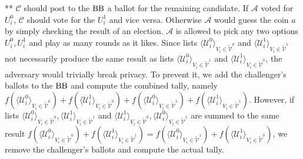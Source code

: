 ** $\mathcal{C}$ should post to the $\operatorname{BB}$ a ballot for the remaining candidate. If  $\mathcal{A}$  voted for $U_i^0$, $\mathcal{C}$ should vote for the $U_i^1$ and vice versa. Otherwise  $\mathcal{A}$  would guess the coin $a$ by simply checking the result of an election.  $\mathcal{A}$ is allowed to pick any two options $U_i^0,U_i^1$  and play as many rounds as it likes. Since lists $\langle \mathcal{U}^0_i \rangle _{V_i \in \tilde{\mathcal{V}}^0} $ and  $\langle \mathcal{U}^1_i \rangle _{V_i \in \tilde{\mathcal{V}}^1} $  not necessarily produce the same result as lists  $\langle \mathcal{U}^0_i \rangle _{V_i \in \tilde{\mathcal{V}}^1} $ and  $\langle \mathcal{U}^1_i \rangle _{V_i \in \tilde{\mathcal{V}}^0} $, the adversary would trivially break privacy. To prevent it, we add the challenger's ballots to the $\operatorname{BB}$ and compute the combined tally, namely $f(\langle \mathcal{U}^0_i \rangle _{V_i \in \tilde{\mathcal{V}}^0} ) + f(\langle \mathcal{U}^1_i \rangle _{V_i \in \tilde{\mathcal{V}}^0} )+ f(\langle \mathcal{U}^0_i \rangle _{V_i \in \tilde{\mathcal{V}}^1} ) +  f(\langle \mathcal{U}^1_i \rangle _{V_i \in \tilde{\mathcal{V}}^1} )$. However, if lists $\langle \mathcal{U}^0_i \rangle _{V_i \in \tilde{\mathcal{V}}^0}, \langle \mathcal{U}^1_i \rangle _{V_i \in \tilde{\mathcal{V}}^1}$ and $\langle \mathcal{U}^1_i \rangle _{V_i \in \tilde{\mathcal{V}}^0}, \langle \mathcal{U}^0_i \rangle _{V_i \in \tilde{\mathcal{V}}^1}$ are summed to the same result $f(\langle \mathcal{U}^0_i \rangle _{V_i \in \tilde{\mathcal{V}}^0} ) + f(\langle \mathcal{U}^1_i \rangle _{V_i \in \tilde{\mathcal{V}}^1} ) =  f(\langle \mathcal{U}^0_i \rangle _{V_i \in \tilde{\mathcal{V}}^1} ) +  f(\langle \mathcal{U}^1_i \rangle _{V_i \in \tilde{\mathcal{V}}^0} )$, we remove the challenger's ballots and compute the actual tally. \\\\
